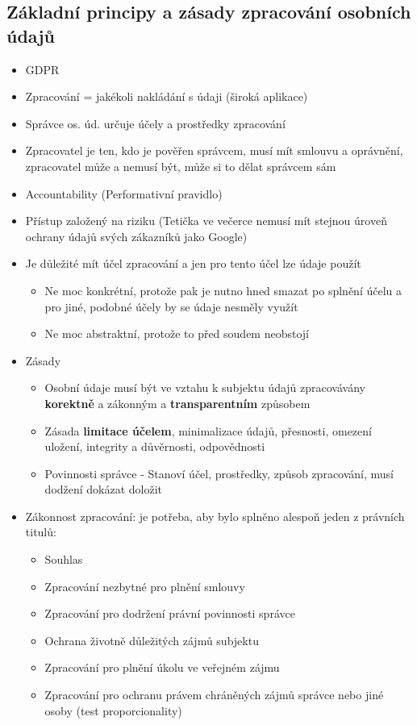 \subsection{Základní principy a zásady zpracování osobních údajů}
\begin{itemize}
    \item GDPR
    \item Zpracování = jakékoli nakládání s údaji (široká aplikace)
    \item Správce os. úd. určuje účely a prostředky zpracování
    \item Zpracovatel je ten, kdo je pověřen správcem, musí mít smlouvu a oprávnění, zpracovatel může a nemusí být, může si to dělat správcem sám
    \item Accountability (Performativní pravidlo) 
    \item Přístup založený na riziku (Tetička ve večerce nemusí mít stejnou úroveň ochrany údajů svých zákazníků jako Google)
    \item Je důležité mít účel zpracování a jen pro tento účel lze údaje použít
    \begin{itemize}
        \item Ne moc konkrétní, protože pak je nutno hned smazat po splnění účelu a pro jiné, podobné účely by se údaje nesměly využít
        \item Ne moc abstraktní, protože to před soudem neobstojí
    \end{itemize}
    \item Zásady
    \begin{itemize}
        \item Osobní údaje musí být ve vztahu k subjektu údajů zpracovávány \textbf{korektně} a zákonným a \textbf{transparentním} způsobem
        \item Zásada \textbf{limitace účelem}, minimalizace údajů, přesnosti, omezení uložení, integrity a důvěrnosti, odpovědnosti
        \item Povinnosti správce - Stanoví účel, prostředky, způsob zpracování, musí dodžení dokázat doložit
    \end{itemize}
    \item Zákonnost zpracování: je potřeba, aby bylo splněno alespoň jeden z právních titulů:
    \begin{itemize}
        \item Souhlas
        \item Zpracování nezbytné pro plnění smlouvy
        \item Zpracování pro dodržení právní povinnosti správce
        \item Ochrana životně důležitých zájmů subjektu
        \item Zpracování pro plnění úkolu ve veřejném zájmu
        \item Zpracování pro ochranu právem chráněných zájmů správce nebo jiné osoby (test proporcionality)
    \end{itemize}
\end{itemize}


